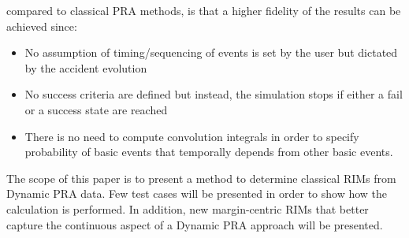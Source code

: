 compared to classical PRA methods, is that a higher fidelity of the results can be achieved since:
\begin{itemize}
  \item No assumption of timing/sequencing of events is set by the user but dictated by the 
        accident evolution
  \item No success criteria are defined but instead, the simulation stops if either a fail 
        or a success state are reached
  \item There is no need to compute convolution integrals in order to specify probability of 
        basic events that temporally depends from other basic events.
\end{itemize}
The scope of this paper is to present a method to determine classical RIMs from Dynamic PRA 
data. Few test cases will be presented in order to show how the calculation is performed. 
In addition, new margin-centric RIMs that better capture the continuous aspect of a Dynamic 
PRA approach will be presented.

